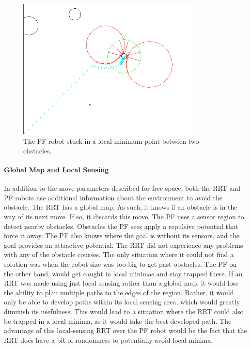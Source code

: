 \documentclass[12pt]{article}
\begin{document}
\begin{figure}
\centering
\includegraphics[width=350]{two_obstacles_cropped.png}
\caption{The PF robot stuck in a local minimum point between two obstacles.}
\end{figure}

\paragraph*{Global Map and Local Sensing}
In addition to the move parameters described for free space, both the RRT and PF robots use additional information about the environment to avoid the obstacle. The RRT has a global map. As such, it knows if an obstacle is in the way of its next move. If so, it discards this move. The PF uses a sensor region to detect nearby obstacles. Obstacles the PF sees apply a repulsive potential that force it away. The PF also knows where the goal is without its sensors, and the goal provides an attractive potential. The RRT did not experience any problems with any of the obstacle courses. The only situation where it could not find a solution was when the robot size was too big to get past obstacles. The PF on the other hand, would get caught in local minimas and stay trapped there. If an RRT was made using just local sensing rather than a global map, it would lose the ability to plan multiple paths to the edges of the region. Rather, it would only be able to develop paths within its local sensing area, which would greatly diminish its usefulness. This would lead to a situation where the RRT could also be trapped in a local minima, as it would take the best developed path. The advantage of this local-sensing RRT over the PF robot would be the fact that the RRT does have a bit of randomness to potentially avoid local minima.
\end{document}

